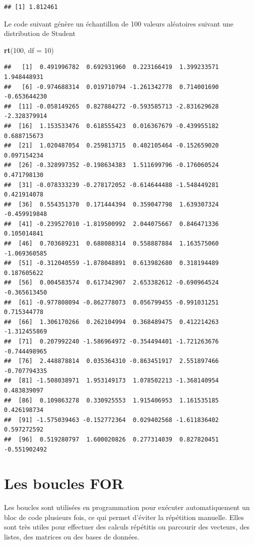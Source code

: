\documentclass[
]{book}
\newenvironment{Shaded}{\begin{snugshade}}{\end{snugshade}}
\newcommand{\AttributeTok}[1]{\textcolor[rgb]{0.13,0.29,0.53}{#1}}
\newcommand{\DecValTok}[1]{\textcolor[rgb]{0.00,0.00,0.81}{#1}}
\newcommand{\FunctionTok}[1]{\textcolor[rgb]{0.13,0.29,0.53}{\textbf{#1}}}
\newcommand{\NormalTok}[1]{#1}
\begin{document}
\begin{verbatim}
## [1] 1.812461
\end{verbatim}

Le code suivant génère un échantillon de 100 valeurs aléatoires suivant une distribution de Student

\begin{Shaded}
\begin{Highlighting}[]
\FunctionTok{rt}\NormalTok{(}\DecValTok{100}\NormalTok{, }\AttributeTok{df =} \DecValTok{10}\NormalTok{)}
\end{Highlighting}
\end{Shaded}

\begin{verbatim}
##   [1]  0.491996782  0.692931960  0.223166419  1.399233571  1.948448931
##   [6] -0.974688314  0.019710794 -1.261342778  0.714001690 -0.653644230
##  [11] -0.058149265  0.827884272 -0.593585713 -2.831629628 -2.328379914
##  [16]  1.153533476  0.618555423  0.016367679 -0.439955182  0.688715673
##  [21]  1.020487054  0.259813715  0.402105464 -0.152659020  0.097154234
##  [26] -0.328997352 -0.198634383  1.511699796 -0.176060524  0.471798130
##  [31] -0.078333239 -0.278172052 -0.614644488 -1.548449281  0.421914078
##  [36]  0.554351370  0.171444394  0.359047798  1.639307324 -0.459919848
##  [41] -0.239527010 -1.819500992  2.044075667  0.846471336  0.105014841
##  [46]  0.703689231  0.688088314  0.558887884  1.163575060 -1.069360585
##  [51] -0.312040559 -1.878048891  0.613982680  0.318194489  0.187605622
##  [56]  0.004583574  0.617342907  2.653382612 -0.690964524 -0.365613450
##  [61] -0.977808094 -0.862778073  0.056799455 -0.991031251  0.715344778
##  [66]  1.306170266  0.262104994  0.368489475  0.412214263 -1.312455869
##  [71]  0.207992240 -1.586964972 -0.354494401 -1.721263676 -0.744498965
##  [76]  2.448878814  0.035364310 -0.863451917  2.551897466 -0.707794335
##  [81] -1.508038971  1.953149173  1.078502213 -1.368140954  0.483839097
##  [86]  0.109863278  0.330925553  1.915406953  1.161535185  0.426198734
##  [91] -1.575039463 -0.152772364  0.029402568 -1.611836402  0.597272592
##  [96]  0.519280797  1.600020826  0.277314039  0.827820451 -0.551902492
\end{verbatim}

\chapter{Les boucles FOR}\label{les-boucles-for}

Les boucles sont utilisées en programmation pour exécuter automatiquement un bloc de code plusieurs fois, ce qui permet d'éviter la répétition manuelle. Elles sont très utiles pour effectuer des calculs répétitis ou parcourir des vecteurs, des listes, des matrices ou des bases de données.
\end{document}
